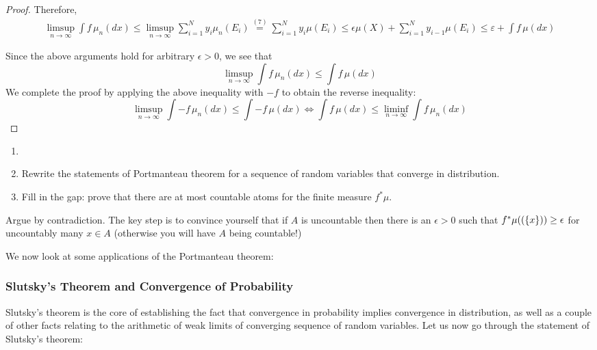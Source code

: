 \begin{proof}
Therefore,
\begin{align*}
    \limsup_{n\to\infty} \int f \, \mu_n(dx) \leq \limsup_{n\to\infty} \sum_{i=1}^N y_i \mu_n(E_i) \overset{(7)}{=} \sum_{i=1}^N y_i \mu(E_i) \leq \epsilon \mu(X) + \sum_{i=1}^N y_{i-1} \mu(E_i) \leq \varepsilon + \int f \, \mu(dx)
\end{align*}

Since the above arguments hold for arbitrary $\epsilon > 0$, we see that 
\begin{equation*}
\limsup_{n\to\infty} \int f \, \mu_n(dx) \leq \int f \, \mu(dx)
\end{equation*}
We complete the proof by applying the above inequality with $-f$ to obtain the reverse inequality:
\begin{equation*}
\limsup_{n\to\infty} \int -f \, \mu_n(dx) \leq \int -f \, \mu(dx) \iff \int f \, \mu(dx) \leq \liminf_{n\to\infty} \int f \, \mu_n(dx)
\end{equation*}
\end{proof}

\begin{exercise}
\begin{enumerate}
    \item[]
    \item Rewrite the statements of Portmanteau theorem for a sequence of random variables that converge in distribution.
    \item Fill in the gap: prove that there are at most countable atoms for the finite measure $f^*\mu$.
\end{enumerate}
\end{exercise}

\begin{hint}
Argue by contradiction. The key step is to convince yourself that if $A$ is uncountable then there is an $\epsilon > 0$ such that $f^*\mu((\left\{ x \right \})) \geq \epsilon$ for uncountably many $x \in A$ (otherwise you will have $A$ being countable!)
\end{hint}

We now look at some applications of the Portmanteau theorem:
\subsubsection{Slutsky's Theorem and Convergence of Probability}
Slutsky's theorem is the core of establishing the fact that convergence in probability implies convergence in distribution, as well as a couple of other facts relating to the arithmetic of weak limits of converging sequence of random variables. Let us now go through the statement of Slutsky's theorem:

